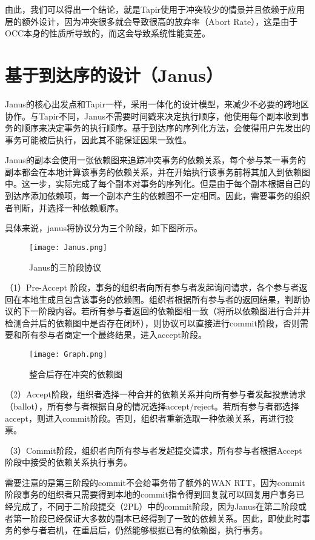 由此，我们可以得出一个结论，就是Tapir使用于冲突较少的情景并且依赖于应用层的额外设计，因为冲突很多就会导致很高的放弃率（Abort Rate），这是由于OCC本身的性质所导致的，而这会导致系统性能变差。

\section{基于到达序的设计（Janus）}

Janus的核心出发点和Tapir一样，采用一体化的设计模型，来减少不必要的跨地区协作。与Tapir不同，Janus不需要时间戳来决定执行顺序，他使用每个副本收到事务的顺序来决定事务的执行顺序。基于到达序的序列化方法，会使得用户先发出的事务可能被后执行，因此其不能保证因果一致性。

Janus的副本会使用一张依赖图来追踪冲突事务的依赖关系，每个参与某一事务的副本都会在本地计算该事务的依赖关系，并在开始执行该事务前将其加入到依赖图中。这一步，实际完成了每个副本对事务的序列化。但是由于每个副本根据自己的到达序添加依赖项，每一个副本产生的依赖图不一定相同。因此，需要事务的组织者判断，并选择一种依赖顺序。

具体来说，janus将协议分为三个阶段，如下图所示。

\begin{figure}[htb]
  \centering
  \texttt{[image: Janus.png]}
  \caption{Janus的三阶段协议}
  \label{fig:badge}
\end{figure}

（1）Pre-Accept 阶段，事务的组织者向所有参与者发起询问请求，各个参与者返回在本地生成且包含该事务的依赖图。组织者根据所有参与者的返回结果，判断协议的下一阶段内容。若所有参与者返回的依赖图相一致（将所以依赖图进行合并并检测合并后的依赖图中是否存在闭环），则协议可以直接进行commit阶段，否则需要和所有参与者商定一个最终结果，进入accept阶段。

\begin{figure}[htb]
  \centering
  \texttt{[image: Graph.png]}
  \caption{整合后存在冲突的依赖图}
  \label{fig:badge}
\end{figure}

（2）Accept阶段，组织者选择一种合并的依赖关系并向所有参与者发起投票请求（ballot），所有参与者根据自身的情况选择accept/reject。若所有参与者都选择accept，则进入commit阶段。否则，组织者重新选取一种依赖关系，再进行投票。

（3）Commit阶段，组织者向所有参与者发起提交请求，所有参与者根据Accept阶段中接受的依赖关系执行事务。

需要注意的是第三阶段的commit不会给事务带了额外的WAN RTT，因为commit阶段事务的组织者只需要得到本地的commit指令得到回复就可以回复用户事务已经完成了，不同于二阶段提交（2PL）中的commit阶段，因为Janus在第二阶段或者第一阶段已经保证大多数的副本已经得到了一致的依赖关系。因此，即使此时事务的参与者宕机，在重启后，仍然能够根据已有的依赖图，执行事务。

